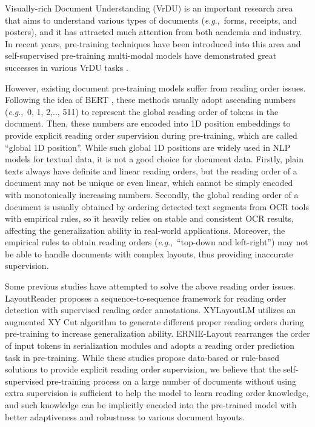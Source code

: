 \documentclass[11pt]{article}
\newcommand{\eg}{\textit{e}.\textit{g}.,\ }
\begin{document}
Visually-rich Document Understanding (VrDU) is an important research area that aims to understand various types of documents (\eg forms, receipts, and posters), and it has attracted much attention from both academia and industry. 
In recent years, pre-training techniques \citep{kenton2019bert, zhang2019ernie} have been introduced into this area and
self-supervised pre-training multi-modal models have demonstrated great successes in various VrDU tasks \citep{xu2020layoutlm, xu2021layoutlmv2,hong2022bros,li2021structurallm}.

However, existing document pre-training models suffer from reading order issues.
 Following the idea of BERT \citep{kenton2019bert}, these methods \citep{xu2020layoutlm, xu2021layoutlmv2, hong2022bros} usually adopt ascending numbers (\eg 0, 1, 2,.., 511) to represent the global reading order of tokens in the document.
Then, these numbers are encoded into 1D position embeddings to provide explicit reading order supervision during pre-training, which are called ``global 1D position''.
While such global 1D positions are widely used in NLP models for textual data, it is not a good choice for document data. 
Firstly, plain texts always have definite and linear reading orders, but the reading order of a document may not be unique or even linear, which cannot be simply encoded with monotonically increasing numbers.
Secondly, the global reading order of a document is usually obtained by ordering detected text segments from OCR tools with empirical rules, so it heavily relies on stable and consistent OCR results, affecting the generalization ability in real-world applications.
Moreover, the empirical rules to obtain reading orders (\eg ``top-down and left-right'') may not be able to handle documents with complex layouts, thus providing inaccurate supervision. 

Some previous studies have attempted to solve the above reading order issues.
LayoutReader \citep{wang2021layoutreader} proposes a sequence-to-sequence framework for reading order detection with supervised reading order annotations.
XYLayoutLM \citep{gu2022xylayoutlm} utilizes an augmented XY Cut algorithm to generate different proper reading orders during pre-training to increase generalization ability.
ERNIE-Layout \citep{peng2022ernie} rearranges the order of input tokens in serialization modules and adopts a reading order prediction task in pre-training.
While these studies propose data-based or rule-based solutions to provide explicit reading order supervision, we believe that the self-supervised pre-training process on a large number of documents without using extra supervision is sufficient to help the model to learn reading order knowledge, and such knowledge can be implicitly encoded into the pre-trained model with better adaptiveness and robustness to various document layouts.  
\end{document}
